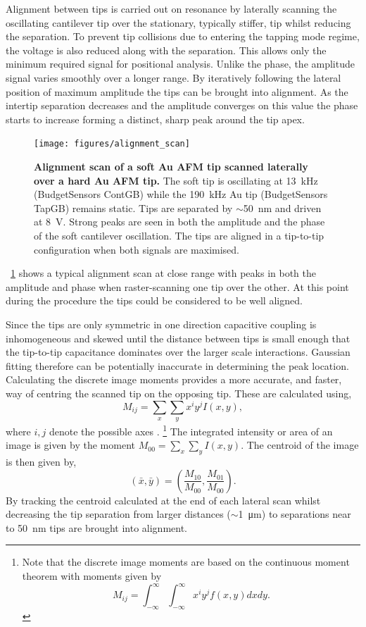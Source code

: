 \documentclass{article}
\begin{document}
Alignment between tips is carried out on resonance by laterally scanning the oscillating cantilever tip over the stationary, typically stiffer, tip whilst reducing the separation. To prevent tip collisions due to entering the tapping mode regime, the voltage is also reduced along with the separation. This allows only the minimum required signal for positional analysis. Unlike the phase, the amplitude signal varies smoothly over a longer range. By iteratively following the lateral position of maximum amplitude the tips can be brought into alignment. As the intertip separation decreases and the amplitude converges on this value the phase starts to increase forming a distinct, sharp peak around the tip apex.

\begin{figure}[h]
\centering
\texttt{[image: figures/alignment\_scan]}
\caption[Alignment scan of a soft Au AFM tip scanned laterally over a hard Au AFM tip]{\textbf{Alignment scan of a soft Au AFM tip scanned laterally over a hard Au AFM tip.} The soft tip is oscillating at \SI{13}{kHz} (BudgetSensors ContGB) while the \SI{190}{kHz} Au tip (BudgetSensors TapGB) remains static. Tips are separated by $\sim$\SI{50}{nm} and driven at \SI{8}{V}. Strong peaks are seen in both the amplitude and the phase of the soft cantilever oscillation. The tips are aligned in a tip-to-tip configuration when both signals are maximised.}
\label{fig:alignment_scan} 
\end{figure}

\figurename~\ref{fig:alignment_scan} shows a typical alignment scan at close range with peaks in both the amplitude and phase when raster-scanning one tip over the other. At this point during the procedure the tips could be considered to be well aligned.

Since the tips are only symmetric in one direction capacitive coupling is {\color{red}inhomogeneous and skewed} until the distance between tips is small enough that the tip-to-tip capacitance dominates over the larger scale interactions. Gaussian fitting therefore can be potentially inaccurate in determining the peak location. Calculating the discrete image moments provides a more accurate, and faster, way of centring the scanned tip on the opposing tip. These are calculated using,
\begin{equation}
M_{ij} = \sum_x \sum_y x^i y^j I(x,y),
\end{equation}
where $i,j$ denote the possible axes \cite{}.%
\footnote{Note that the discrete image moments are based on the continuous moment theorem with moments given by $$M_{ij} = \int_{-\infty}^{\infty} \int_{-\infty}^{\infty} x^i y^j f(x,y) dx dy.$$}
The integrated intensity {\color{red}or area} of an image is given by the moment $M_{00} = \sum_x \sum_y I(x,y)$. The centroid of the image is then given by,
\begin{equation}
(\bar{x},\bar{y}) = \left( \frac{M_{10}}{M_{00}}, \frac{M_{01}}{M_{00}} \right).
\end{equation}
By tracking the centroid calculated at the end of each lateral scan whilst decreasing the tip separation from larger distances ($\sim$\SI{1}{\micro\metre}) to separations near to \SI{50}{nm} tips are brought into alignment.
\end{document}
